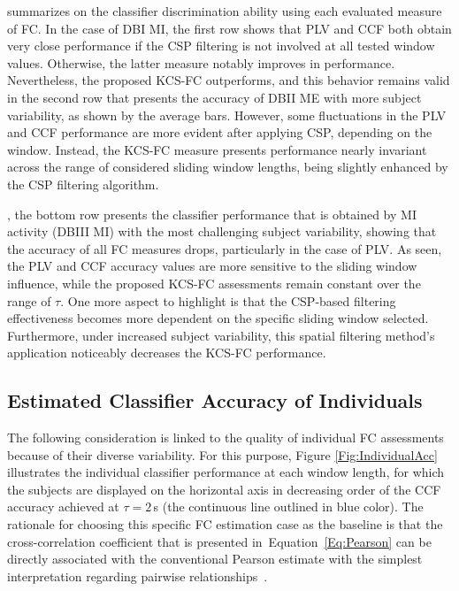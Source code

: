  summarizes  on the classifier discrimination ability using each evaluated measure of FC. In the case of DBI MI, the first row shows that PLV and CCF both obtain very close performance if the CSP filtering is not involved at all tested window values. Otherwise, the latter measure notably improves in performance. Nevertheless, the proposed KCS-FC outperforms, and this behavior remains valid in the second row that presents the accuracy of DBII ME with more subject variability, as shown by the average bars. However, some fluctuations in the PLV and CCF performance are more evident after applying CSP, depending on the window. Instead, the KCS-FC measure presents performance nearly invariant across the range of considered sliding window lengths, being slightly enhanced by the CSP filtering algorithm.

, the bottom row presents the classifier performance that is obtained by MI activity (DBIII MI) with the most challenging subject variability, showing that the accuracy of all FC measures drops, particularly in the case of PLV. As seen, the PLV and CCF accuracy values are more sensitive to the sliding window influence, while the proposed KCS-FC assessments remain constant over the range of $\tau$. One more aspect to highlight is that the CSP-based filtering effectiveness becomes more dependent on the specific sliding window selected. Furthermore, under increased subject variability, this spatial filtering method's application noticeably decreases the KCS-FC performance.

\subsection{Estimated Classifier Accuracy of Individuals}

The following consideration is linked to the quality of individual FC assessments because of their diverse variability. For this purpose, Figure \ref{Fig:IndividualAcc} illustrates the individual classifier performance at each window length, for which the subjects are displayed on the horizontal axis in decreasing order of the CCF accuracy achieved at $\tau=2$\,{s} (the continuous line outlined in blue color). The rationale for choosing this specific FC estimation case as the baseline is that the cross-correlation coefficient that is presented in~Equation~\eqref{Eq:Pearson} can be directly associated with the conventional Pearson estimate with the simplest interpretation regarding pairwise relationships~\cite{georgiadis2019connectivity}.

